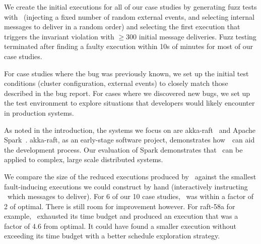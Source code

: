 We create the initial executions for all of our case studies by generating fuzz tests with \sys~(injecting a fixed number of random external events, and selecting internal
messages to deliver in a random order)
and selecting the first execution that triggers the invariant
violation with $\geq$300 initial message deliveries.
Fuzz testing terminated after finding a faulty execution within 10s of minutes for most of our case studies.

For case studies where the bug was previously known,
we set up the initial test conditions (cluster configuration, external events) to
closely match those described in the bug report. For cases where we discovered
new bugs, we set up the test environment to explore situations that developers
would likely encounter in production systems.

As noted in the introduction, the systems we focus on are
akka-raft~\cite{akka-raft} and Apache Spark~\cite{zaharia2012resilient}.
akka-raft, as an early-stage software project, demonstrates how~\sys~can aid the development process.
Our evaluation of Spark demonstrates that \sys~can be applied to complex, large scale distributed systems.

 We compare the size of the
reduced executions produced by \sys~against the
smallest fault-inducing executions we could construct by hand (interactively
instructing \sys~which messages to deliver).
For 6 of our 10 case studies, \sys~was within a factor of 2 of optimal.
There is still room for improvement however. For raft-58a for example,
\sys~exhausted its time budget and produced an execution that was a
factor of 4.6 from optimal. It could have found a smaller execution without
exceeding its time budget with a better schedule exploration strategy.


